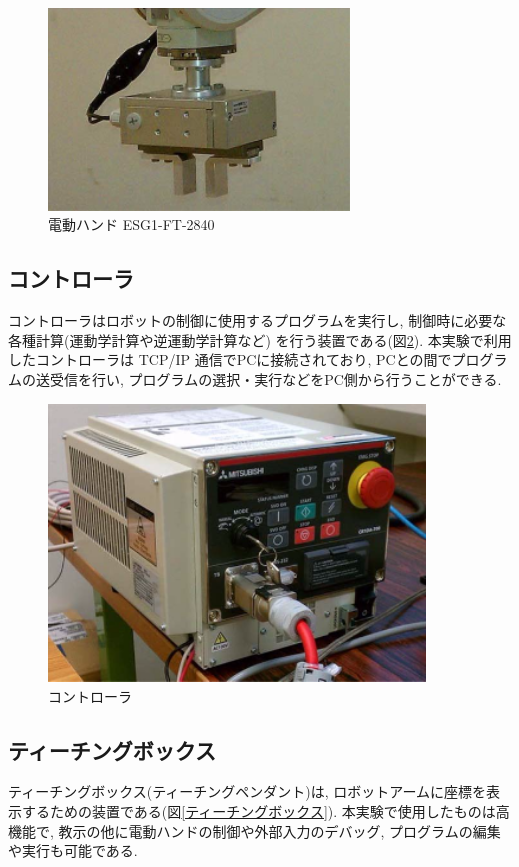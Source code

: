 \documentclass[a4paper,11pt]{jsarticle}
\begin{document}
\begin{figure}[H]
  \begin{center}
    \includegraphics[width = 8cm]{画像/電動ハンド.png}
    \caption{電動ハンド ESG1-FT-2840}
    \label{電動ハンド}
  \end{center}
\end{figure}

\subsection{コントローラ}
コントローラはロボットの制御に使用するプログラムを実行し, 制御時に必要な各種計算(運動学計算や逆運動学計算など)
を行う装置である(図\ref{コントローラ}). 本実験で利用したコントローラは TCP/IP 通信でPCに接続されており,
PCとの間でプログラムの送受信を行い, プログラムの選択・実行などをPC側から行うことができる.

\begin{figure}[H]
  \begin{center}
    \includegraphics[width = 10cm]{画像/コントローラ.png}
    \caption{コントローラ}
    \label{コントローラ}
  \end{center}
\end{figure}

\subsection{ティーチングボックス}
ティーチングボックス(ティーチングペンダント)は, ロボットアームに座標を表示するための装置である(図\ref{ティーチングボックス}).
本実験で使用したものは高機能で, 教示の他に電動ハンドの制御や外部入力のデバッグ, プログラムの編集や実行も可能である.
\end{document}
